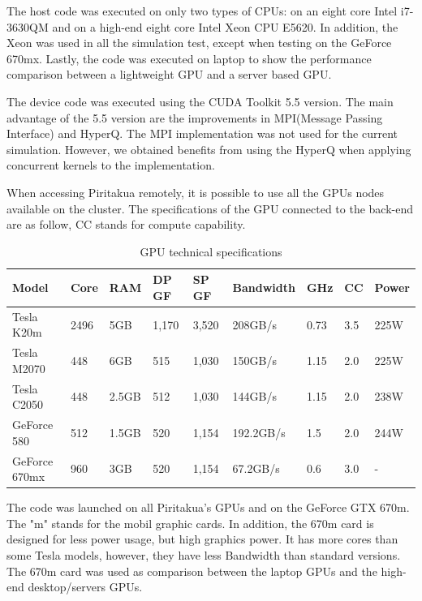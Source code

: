 The host code was executed on only two types of CPUs: on an eight core Intel i7-3630QM and on a high-end eight core Intel Xeon CPU E5620. In addition, the Xeon was used in all the simulation test, except when testing on the GeForce 670mx. Lastly, the code was executed on laptop to show the performance comparison between a lightweight GPU and a server based GPU.

The device code was executed using the CUDA Toolkit 5.5 version. The main advantage of the 5.5 version are the improvements in MPI(Message Passing Interface) and HyperQ. The MPI implementation was not used for the current simulation. However, we obtained benefits from using the HyperQ when applying concurrent kernels to the implementation. 

When accessing Piritakua remotely, it is possible to use all the GPUs nodes available on the cluster. The specifications of the GPU connected to the back-end are as follow, CC stands for compute capability.

\begin{table}[h]
\centering
  \begin{tabular}{ |  l  |  l  |  l  |  l  |  l  | l | l | l |l | }
    \hline
    Model & Core& RAM& DP GF& SP GF& Bandwidth& GHz& CC & Power\\
    \hline
    Tesla K20m & 2496 & 5GB & 1,170 & 3,520 & 208GB/s & 0.73 & 3.5 & 225W \\
   \hline
    Tesla M2070 & 448 & 6GB & 515 & 1,030 & 150GB/s & 1.15 &  2.0 & 225W\\
   \hline
     Tesla C2050 & 448 & 2.5GB & 512 & 1,030 & 144GB/s & 1.15  & 2.0 & 238W \\
   \hline
      GeForce 580 & 512 & 1.5GB & 520 & 1,154 & 192.2GB/s & 1.5 & 2.0 & 244W \\
   \hline
   GeForce 670mx & 960 & 3GB & 520 & 1,154 & 67.2GB/s & 0.6 & 3.0 &  - \\
   \hline
  \end{tabular}
    \caption{GPU technical specifications}
  \label{tab:gpus}
  \end{table}
  
The code was launched on all Piritakua's GPUs and on the GeForce GTX 670m. The "m" stands for the mobil graphic cards. In addition, the 670m card is designed for less power usage, but high graphics power. It has more cores than some Tesla models, however, they have less Bandwidth than standard versions. The 670m card was used as comparison between the laptop GPUs and the high-end desktop/servers GPUs.
     
